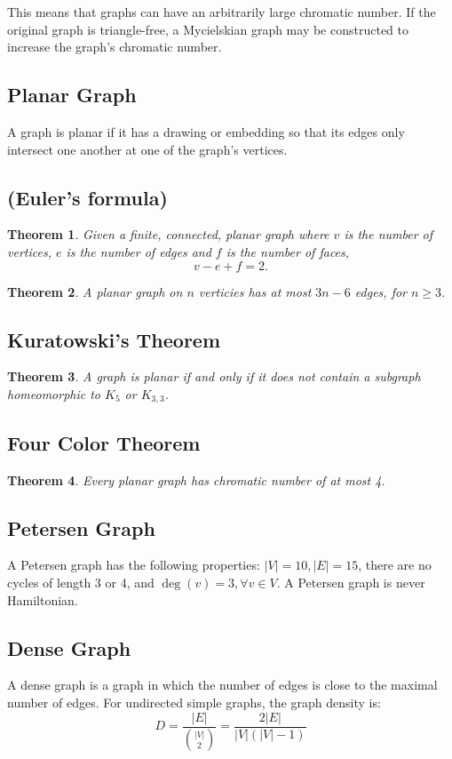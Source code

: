 \documentclass{article}
\newtheorem{theorem}{Theorem}[section]
\begin{document}
This means that graphs can have an arbitrarily large chromatic number. If the original graph is triangle-free, a Mycielskian graph may be constructed to increase the graph's chromatic number.

\subsection{Planar Graph}
A graph is planar if it has a drawing or embedding so that its edges only intersect one another at one of the graph's vertices.


\subsection{(Euler's formula)}
\begin{theorem}
Given a finite, connected, planar graph where $v$ is the number of vertices, $e$ is the number of edges and $f$ is the number of faces,
\[
    v-e+f=2.
\]
\end{theorem}

\begin{theorem}
A planar graph on $n$ verticies has at most $3n-6$ edges, for $n \geq 3$.
\end{theorem}

\subsection{Kuratowski's Theorem}
\begin{theorem}
A graph is planar if and only if it does not contain a subgraph homeomorphic to $K_5$ or $K_{3,3}$.
\end{theorem}

\subsection{Four Color Theorem}
\begin{theorem}
Every planar graph has chromatic number of at most 4.
\end{theorem}

\subsection{Petersen Graph}
A Petersen graph has the following properties: $|V| = 10, |E| = 15$, there are no cycles of length 3 or 4, and $\deg(v) = 3, \forall v \in V$. A Petersen graph is never Hamiltonian.

\subsection{Dense Graph}
A dense graph is a graph in which the number of edges is close to the maximal number of edges. For undirected simple graphs, the graph density is:
\[
D={\frac {|E|}{\binom {|V|}{2}}}={\frac {2|E|}{|V|(|V|-1)}}
\]
\end{document}
